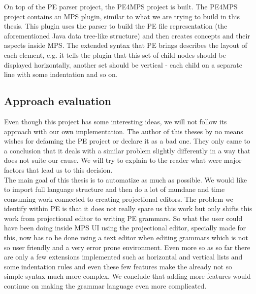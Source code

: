 On top of the PE parser project, the PE4MPS project is built. The PE4MPS project contains an MPS plugin, similar to what we are trying to build in this thesis. This plugin uses the parser to build the PE file representation (the aforementioned Java data tree-like structure) and then creates concepts and their aspects inside MPS. The extended syntax that PE brings describes the layout of each element, e.g. it tells the plugin that this set of child nodes should be displayed horizontally, another set should be vertical - each child on a separate line with some indentation and so on.

\subsection{Approach evaluation}
Even though this project has some interesting ideas, we will not follow its approach with our own implementation. The author of this theses by no means wishes for defaming the PE project or declare it as a bad one. They only came to a conclusion that it deals with a similar problem slightly differently in a way that does not suite our cause. We will try to explain to the reader what were major factors that lead us to this decision.
\\

The main goal of this thesis is to automatize as much as possible. We would like to import full language structure and then do a lot of mundane and time consuming work connected to creating projectional editors. The problem we identify within PE is that it does not really spare us this work but only shifts this work from projectional editor to writing PE grammars. So what the user could have been doing inside MPS UI using the projectional editor, specially made for this, now has to be done using a text editor when editing grammars which is not so user friendly and a very error prone environment. Even more so as so far there are only a few extensions implemented such as horizontal and vertical lists and some indentation rules and even these few features make the already not so simple syntax much more complex. We conclude that adding more features would continue on making the grammar language even more complicated.
\\

